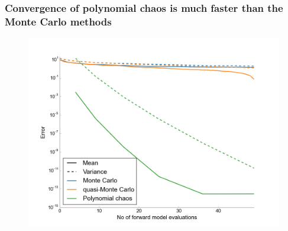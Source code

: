 \documentclass[handout]{beamer}
\begin{document}
\begin{frame}
 \frametitle{Convergence of polynomial chaos is much faster than the Monte Carlo methods}
\vspace{-5.8mm}
\begin{figure}
    \includegraphics[width=1\textwidth]{qMC-MC-PC_convergence_2D.png}
  \end{figure}

 \end{frame}



%
%
%
%
\end{document}
